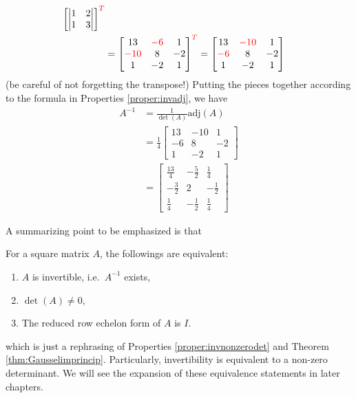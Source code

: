 \begin{solution}
\begin{align*}
\begin{bmatrix}
\begin{vmatrix}
1 & 2 \\
1 & 3 
\end{vmatrix} 
\end{bmatrix}^{\color{red}{T}} \\
&= 
\begin{bmatrix}
13 & \textcolor{red}{-6} & 1 \\
\textcolor{red}{-10} & 8 & -2 \\
1 & -2 & 1
\end{bmatrix}^{\color{red}{T}} = 
\begin{bmatrix}
13 & \textcolor{red}{-10} & 1 \\
\textcolor{red}{-6} & 8 & -2 \\
1 & -2 & 1
\end{bmatrix}
\end{align*}
(be careful of not forgetting the transpose!) Putting the pieces together according to the formula in Properties \ref{proper:invadj}, we have
\begin{align*}
A^{-1} &= \frac{1}{\det(A)}\text{adj}(A) \\
&= \frac{1}{4}
\begin{bmatrix}
13 & -10 & 1 \\
-6 & 8 & -2 \\
1 & -2 & 1
\end{bmatrix} \\
&= 
\begin{bmatrix}
\frac{13}{4} & -\frac{5}{2} & \frac{1}{4} \\
-\frac{3}{2} & 2 & -\frac{1}{2} \\
\frac{1}{4} & -\frac{1}{2} & \frac{1}{4}
\end{bmatrix}
\end{align*}
\end{solution}
A summarizing point to be emphasized is that
\begin{thm}
\label{thm:equiv1}
For a square matrix $A$, the followings are equivalent:
\begin{enumerate}[label=(\alph*)]
\item $A$ is invertible, i.e.\ $A^{-1}$ exists,
\item $\det(A) \neq 0$,
\item The reduced row echelon form of $A$ is $I$.
\end{enumerate}
\end{thm}
which is just a rephrasing of Properties \ref{proper:invnonzerodet} and Theorem \ref{thm:Gausselimprincip}. 
Particularly, invertibility is equivalent to a non-zero determinant. We will see the expansion of these equivalence statements in later chapters.


